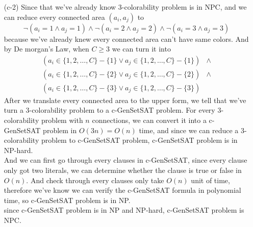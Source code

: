 \documentclass{homework}
\begin{document}
\begin{itemize}
    \item[(c-2)]
    Since that we've already know 3-colorability problem is in NPC, and we can reduce every connected area $(a_i, a_j)$ to 
    \[\lnot(a_i = 1\wedge a_j = 1)\wedge\lnot(a_i = 2\wedge a_j = 2)\wedge\lnot(a_i = 3\wedge a_j = 3)\]
    because we've already knew every connected area can't have same colors. And by De morgan's Law, when $C\geq3$ we can turn it into 
    \begin{align*}
        (a_i \in\{1,2,\ldots,C\}-\{1\} \vee a_j \in\{1,2,\ldots,C\}-\{1\} )&\wedge\\
        (a_i \in\{1,2,\ldots,C\}-\{2\} \vee a_j \in\{1,2,\ldots,C\}-\{2\} )&\wedge\\
        (a_i \in\{1,2,\ldots,C\}-\{3\} \vee a_j \in\{1,2,\ldots,C\}-\{3\} )&
    \end{align*}
    After we translate every connected area to the upper form, we tell that we've turn a 3-colorability problem to a c-GenSetSAT problem. For every 3-colorability problem with $n$ connections, we can convert it into a c-GenSetSAT problem in $O(3n) = O(n)$ time, and since we can reduce a 3-colorability problem to c-GenSetSAT problem, c-GenSetSAT problem is in NP-hard.\\
    And we can first go through every clauses in c-GenSetSAT, since every clause only got two literals, we can determine whether the clause is true or false in $O(n)$. And check through every clauses only take $O(n)$ unit of time, therefore we've know we can verify the c-GenSetSAT formula in polynomial time, so c-GenSetSAT problem is in NP.\\
    since c-GenSetSAT problem is in NP and NP-hard, c-GenSetSAT problem is NPC\@.

\end{itemize}
\clearpage
\end{document}
